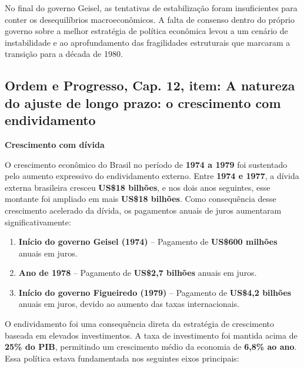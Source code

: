 \documentclass[a4paper,12pt]{article}[abntex2]
\begin{document}
No final do governo Geisel, as tentativas de estabilização foram insuficientes para conter os desequilíbrios macroeconômicos. A falta de consenso dentro do próprio governo sobre a melhor estratégia de política econômica levou a um cenário de instabilidade e ao aprofundamento das fragilidades estruturais que marcaram a transição para a década de 1980.

\subsection{\textbf{Ordem e Progresso, Cap. 12, item: A natureza do ajuste de longo prazo: o crescimento com endividamento}}

\textbf{Crescimento com dívida}

O crescimento econômico do Brasil no período de \textbf{1974 a 1979} foi sustentado pelo aumento expressivo do endividamento externo. Entre \textbf{1974 e 1977}, a dívida externa brasileira cresceu \textbf{US\$18 bilhões}, e nos dois anos seguintes, esse montante foi ampliado em mais \textbf{US\$18 bilhões}. Como consequência desse crescimento acelerado da dívida, os pagamentos anuais de juros aumentaram significativamente: 

\begin{enumerate}
    \item \textbf{Início do governo Geisel (1974)} – Pagamento de \textbf{US\$600 milhões} anuais em juros.
    \item \textbf{Ano de 1978} – Pagamento de \textbf{US\$2,7 bilhões} anuais em juros.
    \item \textbf{Início do governo Figueiredo (1979)} – Pagamento de \textbf{US\$4,2 bilhões} anuais em juros, devido ao aumento das taxas internacionais.
\end{enumerate}

O endividamento foi uma consequência direta da estratégia de crescimento baseada em elevados investimentos. A taxa de investimento foi mantida acima de \textbf{25\% do PIB}, permitindo um crescimento médio da economia de \textbf{6,8\% ao ano}. Essa política estava fundamentada nos seguintes eixos principais:
\end{document}
